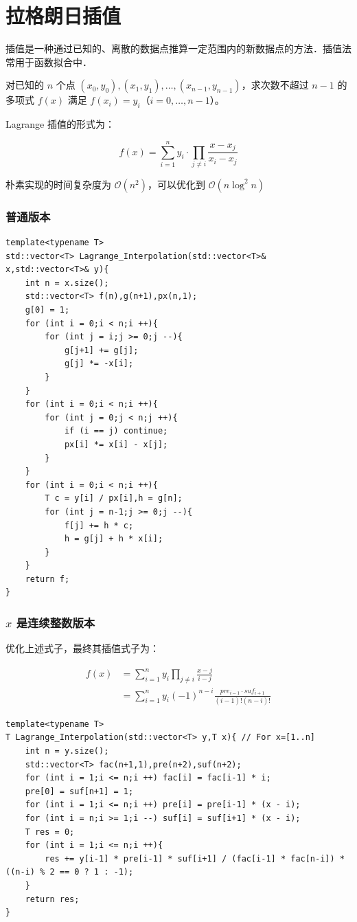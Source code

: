 \section{拉格朗日插值}

插值是一种通过已知的、离散的数据点推算一定范围内的新数据点的方法．插值法常用于函数拟合中．

对已知的 $n$ 个点 $(x_0,y_0),(x_1,y_1),\dots,(x_{n-1},y_{n-1})$，求次数不超过 $n-1$ 的多项式 $f(x)$ 满足 $f(x_i)=y_i$（$i=0,\dots,n-1$）。

Lagrange 插值的形式为：

$$f(x)=\sum_{i=1}^ny_i\cdot\prod_{j\neq i}\dfrac{x-x_j}{x_i-x_j}$$

朴素实现的时间复杂度为 $\mathcal{O}(n^2)$，可以优化到 $\mathcal{O}(n\log^2n)$

\subsubsection{普通版本}

\begin{lstlisting}
template<typename T>
std::vector<T> Lagrange_Interpolation(std::vector<T>& x,std::vector<T>& y){
    int n = x.size();
    std::vector<T> f(n),g(n+1),px(n,1);
    g[0] = 1;
    for (int i = 0;i < n;i ++){
        for (int j = i;j >= 0;j --){
            g[j+1] += g[j];
            g[j] *= -x[i];
        }
    }
    for (int i = 0;i < n;i ++){
        for (int j = 0;j < n;j ++){
            if (i == j) continue;
            px[i] *= x[i] - x[j];
        }
    }
    for (int i = 0;i < n;i ++){
        T c = y[i] / px[i],h = g[n];
        for (int j = n-1;j >= 0;j --){
            f[j] += h * c;
            h = g[j] + h * x[i];
        }
    }
    return f;
}
\end{lstlisting}

\subsubsection{$x$ 是连续整数版本}

优化上述式子，最终其插值式子为：

\begin{equation}\begin{split}f(x)&=\sum_{i=1}^{n}y_i\prod_{j\neq i}\frac{x-j}{i-j}\\ &=\sum_{i=1}^{n}y_i(-1)^{n-i}\frac{pre_{i-1}\cdot suf_{i+1}}{(i-1)!(n-i)!}\end{split}\end{equation}

\begin{lstlisting}
template<typename T>
T Lagrange_Interpolation(std::vector<T> y,T x){ // For x=[1..n]
    int n = y.size();
    std::vector<T> fac(n+1,1),pre(n+2),suf(n+2);
    for (int i = 1;i <= n;i ++) fac[i] = fac[i-1] * i;
    pre[0] = suf[n+1] = 1;
    for (int i = 1;i <= n;i ++) pre[i] = pre[i-1] * (x - i);
    for (int i = n;i >= 1;i --) suf[i] = suf[i+1] * (x - i);
    T res = 0;
    for (int i = 1;i <= n;i ++){
        res += y[i-1] * pre[i-1] * suf[i+1] / (fac[i-1] * fac[n-i]) * ((n-i) % 2 == 0 ? 1 : -1);
    }
    return res;
}
\end{lstlisting}